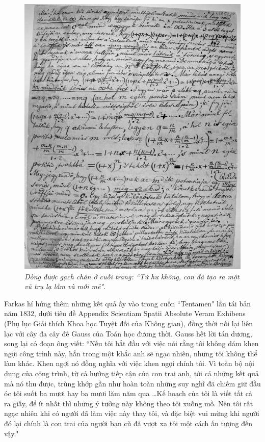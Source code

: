 \begin{multicols}{2}
\begin{figure}[H]
		\includegraphics[width= 1\linewidth]{Bolyai_letter_2}
		\caption{\small\textit{\color{lichsutoanhoc}Dòng được gạch chân ở cuối trang: ``Từ hư không, con đã tạo ra một vũ trụ lạ lẫm và mới mẻ".}}
		\vspace*{-10pt}
	\end{figure}
	Farkas hí hửng thêm những kết quả ấy vào trong cuốn ``Tentamen" lần tái bản năm $1832$, dưới tiêu đề Appendix Scientiam Spatii Absolute Veram Exhibens (Phụ lục Giải thích Khoa học Tuyệt đối của Không gian), đồng thời nối lại liên lạc với cây đa cây đề Gauss của Toán học đương thời. Gauss hết lời tán dương, song lại có đoạn ông viết:
	\vskip 0.1cm
	``Nếu tôi bắt đầu với việc nói rằng tôi không dám khen ngợi công trình này, hẳn trong một khắc anh sẽ ngạc nhiên, nhưng tôi không thể làm khác. Khen ngợi nó đồng nghĩa với việc khen ngợi chính tôi. Vì toàn bộ nội dung của công trình, từ cả hướng tiếp cận của con trai anh, tới cả những kết quả mà nó thu được, trùng khớp gần như hoàn toàn những suy nghĩ đã chiếm giữ đầu óc tôi suốt ba mươi hay ba mươi lăm năm qua \ldots Kế hoạch của tôi là viết tất cả ra giấy, để ít nhất thì những ý tưởng này không theo tôi xuống mồ. Nên tôi rất ngạc nhiên khi có người đã làm việc này thay tôi, và đặc biệt vui mừng khi người đó lại chính là con trai của người bạn cũ đã vượt xa tôi một cách ấn tượng đến vậy."

\end{multicols}
